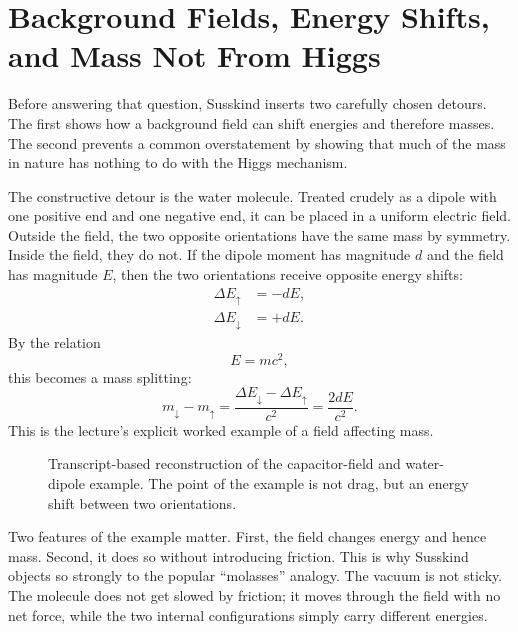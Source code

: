 \section{Background Fields, Energy Shifts, and Mass Not From Higgs}

Before answering that question, Susskind inserts two carefully chosen detours. The first shows how a background field can shift energies and therefore masses. The second prevents a common overstatement by showing that much of the mass in nature has nothing to do with the Higgs mechanism.

The constructive detour is the water molecule. Treated crudely as a dipole with one positive end and one negative end, it can be placed in a uniform electric field. Outside the field, the two opposite orientations have the same mass by symmetry. Inside the field, they do not. If the dipole moment has magnitude \(d\) and the field has magnitude \(E\), then the two orientations receive opposite energy shifts:
\begin{align}
\Delta E_{\uparrow} &= -dE,\\
\Delta E_{\downarrow} &= +dE.
\end{align}
By the relation
\begin{equation}
E=mc^{2},
\end{equation}
this becomes a mass splitting:
\begin{equation}
m_{\downarrow}-m_{\uparrow}
=
\frac{\Delta E_{\downarrow}-\Delta E_{\uparrow}}{c^{2}}
=
\frac{2dE}{c^{2}}.
\end{equation}
This is the lecture's explicit worked example of a field affecting mass.

\begin{figure}
\centering
{}
\caption{Transcript-based reconstruction of the capacitor-field and water-dipole example. The point of the example is not drag, but an energy shift between two orientations.}
\end{figure}

Two features of the example matter. First, the field changes energy and hence mass. Second, it does so without introducing friction. This is why Susskind objects so strongly to the popular ``molasses'' analogy. The vacuum is not sticky. The molecule does not get slowed by friction; it moves through the field with no net force, while the two internal configurations simply carry different energies.

